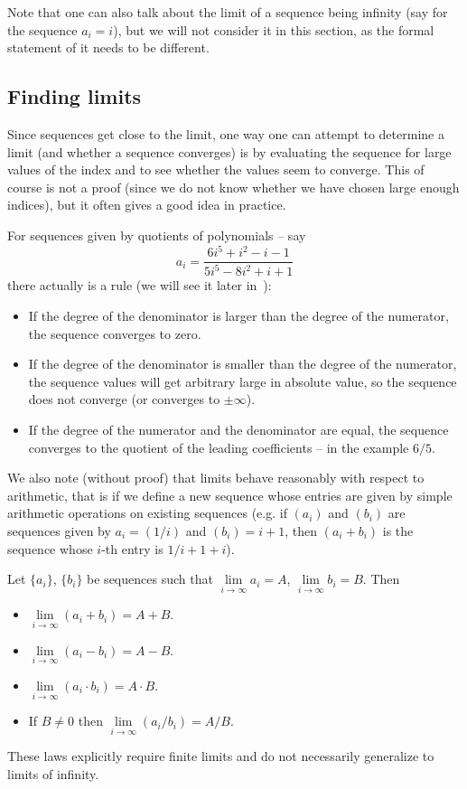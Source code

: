 Note that one can also talk about the limit of a sequence being infinity (say
for the sequence $a_i=i$), but we will not consider it in this section, as
the formal statement of it needs to be different.

\subsection{Finding limits}

Since sequences get close to the limit, one way one can attempt to determine a limit
(and whether a sequence converges) is by evaluating the sequence for large values of the
index and to see whether the values seem to converge. This of course is not a proof
(since we do not know whether we have chosen large enough indices), but it often gives a
good idea in practice.

For sequences given by quotients of polynomials -- say
\[
a_i=\frac{6i^5+i^2-i-1}{5i^5-8i^2+i+1}
\]
there actually is a rule (we will see it later in~):
\begin{itemize}
\item If the degree of the denominator is larger than the degree of the numerator, the
sequence converges to zero.
\item If the degree of the denominator is smaller than the degree of the numerator, the
sequence values will get arbitrary large in absolute value, so the sequence does not
converge (or converges to $\pm\infty$).
\item If the degree of the numerator and the denominator are equal, the
sequence converges to the quotient of the leading coefficients -- in the
example $6/5$.
\end{itemize}

We also note (without proof) that limits behave reasonably with respect to
arithmetic, that is if we define a new sequence whose entries are given by
simple arithmetic operations on existing sequences (e.g. if $(a_i)$ and
$(b_i)$ are sequences given by $a_i=(1/i)$ and
$(b_i)=i+1$, then $(a_i+b_i)$ is the sequence whose $i$-th entry is
$1/i+1+i$).
\begin{lemma}
\label{limitlaws}
Let $\{a_i\}$, $\{b_i\}$ be sequences such that
$\lim\limits_{i\to\infty} a_i=A$,
$\lim\limits_{i\to\infty} b_i=B$. Then
\begin{itemize}
\item $\lim\limits_{i\to\infty} (a_i+b_i)=A+B$.
\item $\lim\limits_{i\to\infty} (a_i-b_i)=A-B$.
\item $\lim\limits_{i\to\infty} (a_i\cdot b_i)=A\cdot B$.
\item If $B\not=0$ then $\lim\limits_{i\to\infty} (a_i/b_i)=A/B$.
\end{itemize}
\end{lemma}
These laws explicitly require finite limits and do not necessarily generalize
to limits of infinity.
\bigskip

